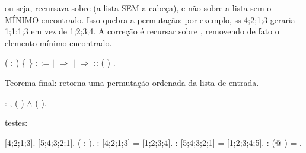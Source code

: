     ou seja, recursava sobre  (a lista SEM a cabeça), e não sobre a lista
    sem o MÍNIMO encontrado. Isso quebra a permutação: por exemplo,
    ss 4;2;1;3 geraria 1;1;1;3 em vez de 1;2;3;4.
    A correção é recursar sobre   , removendo de fato o
    elemento mínimo encontrado. 
\begin{coqdoccode}
\coqdocnoindent
{}  ( :  ) \{  \} :   :=\coqdoceol
\coqdocindent{1.00em}
   \coqdoceol
\coqdocindent{1.00em}
\ensuremath{|}  \ensuremath{\Rightarrow} \coqdoceol
\coqdocindent{1.00em}
\ensuremath{|}   \ensuremath{\Rightarrow}  ::  (  )\coqdoceol
\coqdocindent{1.00em}
.\coqdoceol
\coqdocemptyline
\end{coqdoccode}
Teorema final:  retorna uma permutação ordenada da lista de entrada. 
\begin{coqdoccode}
\coqdocnoindent
{}  : \coqdockw{\ensuremath{\forall}} ,   ( ) \ensuremath{\land}   ( ).\coqdoceol
\coqdocemptyline
\end{coqdoccode}
testes: 
\begin{coqdoccode}
\coqdocemptyline
\coqdocnoindent
{}    [4;2;1;3].\coqdoceol
\coqdocnoindent
{}    [5;4;3;2;1].\coqdoceol
\coqdocnoindent
{}    ( :  ).\coqdoceol
\coqdocemptyline
\coqdocnoindent
{}  :  [4;2;1;3] = [1;2;3;4].\coqdoceol
 \coqdocemptyline
\coqdocnoindent
{}  :  [5;4;3;2;1] = [1;2;3;4;5].\coqdoceol
 \coqdocemptyline
\coqdocnoindent
{}  :  (@ ) = .\coqdoceol
 \end{coqdoccode}
